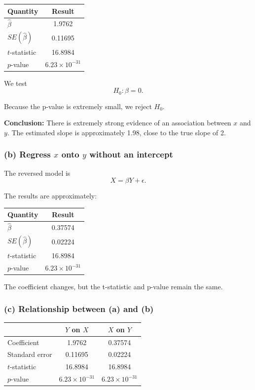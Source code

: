\documentclass[12pt,a4paper]{article}
\begin{document}
\begin{center}
\begin{tabular}{lc}
\toprule
Quantity & Result\\
\midrule
$\hat{\beta}$ & 1.9762\\
$SE(\hat{\beta})$ & 0.11695\\
$t$-statistic & 16.8984\\
$p$-value & $6.23\times10^{-31}$\\
\bottomrule
\end{tabular}
\end{center}

We test
\[
H_0:\beta=0.
\]

Because the p-value is extremely small, we reject $H_0$.

\textbf{Conclusion:} There is extremely strong evidence of an association
between $x$ and $y$. The estimated slope is approximately 1.98, close to
the true slope of 2.

\subsubsection*{(b) Regress $x$ onto $y$ without an intercept}

The reversed model is
\[
X=\beta Y+\epsilon.
\]

The results are approximately:

\begin{center}
\begin{tabular}{lc}
\toprule
Quantity & Result\\
\midrule
$\hat{\beta}$ & 0.37574\\
$SE(\hat{\beta})$ & 0.02224\\
$t$-statistic & 16.8984\\
$p$-value & $6.23\times10^{-31}$\\
\bottomrule
\end{tabular}
\end{center}

The coefficient changes, but the t-statistic and p-value remain the same.

\subsubsection*{(c) Relationship between (a) and (b)}

\begin{center}
\begin{tabular}{lcc}
\toprule
 & $Y$ on $X$ & $X$ on $Y$\\
\midrule
Coefficient & 1.9762 & 0.37574\\
Standard error & 0.11695 & 0.02224\\
$t$-statistic & 16.8984 & 16.8984\\
$p$-value & $6.23\times10^{-31}$ & $6.23\times10^{-31}$\\
\bottomrule
\end{tabular}
\end{center}
\end{document}

